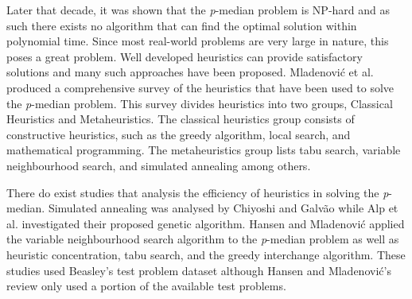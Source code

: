 \documentclass[11pt]{article}
\begin{document}
	Later that decade, it was shown that the \emph{p}-median problem is NP-hard  and as such there exists no algorithm that can find the optimal solution within polynomial time.  Since most real-world problems are very large in nature, this poses a great problem.  Well developed heuristics can provide satisfactory solutions and many such approaches have been proposed.  Mladenovi\'{c} et al. \cite{MLAD07} produced a comprehensive survey of the heuristics that have been used to solve the \emph{p}-median problem.  This survey divides heuristics into two groups, Classical Heuristics and Metaheuristics.  The classical heuristics group consists of constructive heuristics, such as the greedy algorithm, local search, and mathematical programming.  The metaheuristics group lists tabu search, variable neighbourhood search, and simulated annealing among others.
	
	There do exist studies that analysis the efficiency of heuristics in solving the \emph{p}-median.  Simulated annealing was analysed by Chiyoshi  and Galv\~{a}o  \cite{CHIY00} while Alp et al. \cite{ALPO03} investigated their proposed genetic algorithm.  Hansen and Mladenovi\'{c} \cite{HANS01} applied the variable neighbourhood search algorithm to the \emph{p}-median problem as well as heuristic concentration, tabu search, and the greedy interchange algorithm.  These studies used Beasley's test problem dataset although Hansen  and Mladenovi\'{c}'s review only used a portion of the available test problems.  
	
\end{document}
